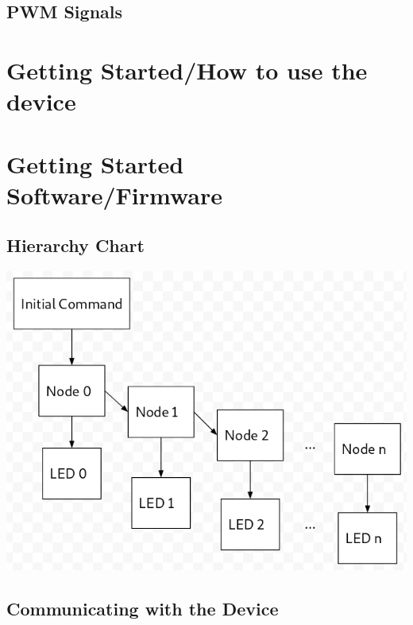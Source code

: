 \documentclass{hitec}
\begin{document}



\subsection{PWM Signals}





\section{Getting Started/How to use the device}





\section{Getting Started Software/Firmware}




\subsection{Hierarchy Chart}

\includegraphics[scale=0.5]{hierarchical-diagram.png}

\subsection{Communicating with the Device}
\end{document}
